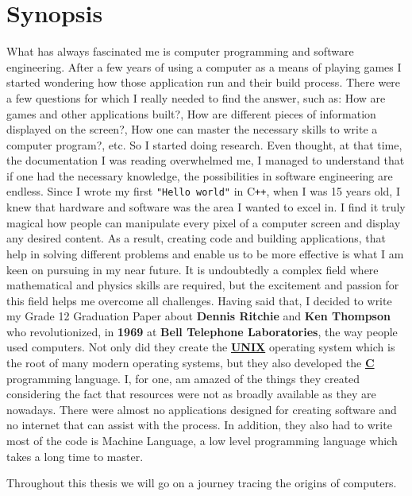 \documentclass[12pt]{article}
\begin{document}
\section{Synopsis}
What has always fascinated me is computer programming and software engineering.
After a few years of using a computer as a means of playing games I started wondering how those application run and their build process.
There were a few questions for which I really needed to find the answer, such as: How are games and other applications built?, How are different pieces of information displayed on the screen?,
How one can master the necessary skills to write a computer program?, etc. So I started doing research. Even thought, at that time, the documentation I was reading overwhelmed me,
I managed to understand that if one had the necessary knowledge, the possibilities in software engineering are endless. Since I wrote my first \verb|"Hello world"| in C\texttt{++}, when I was 15 years old,
I knew that hardware and software was the area I wanted to excel in. I find it truly magical how people can manipulate every pixel of a computer screen and display any desired content.\newline\newline
As a result, creating code and building applications, that help in solving different problems and enable us to be more effective is what I am keen on pursuing in my near future.
It is undoubtedly a complex field where mathematical and physics skills are required, but the excitement and passion for this field helps me overcome all challenges. \newline\newline
Having said that, I decided to write my Grade 12 Graduation Paper about \textbf{Dennis Ritchie} and \textbf{Ken Thompson} who revolutionized, in \textbf{1969} at \textbf{Bell Telephone Laboratories},
the way people used computers. Not only did they create the \underline{\textbf{UNIX}} operating system which is the root of many modern operating systems, but they also developed the \underline{\textbf{C}}
programming language. I, for one, am amazed of the things they created considering the fact that resources were not as broadly available as they are nowadays.
There were almost no applications designed for creating software and no internet that can assist with the process. In addition, they also had to write most of the code is Machine Language,
a low level programming language which takes a long time to master.\newline
\begin{center}
    Throughout this thesis we will go on a journey tracing the origins of computers.\newline
\end{center}
\end{document}
